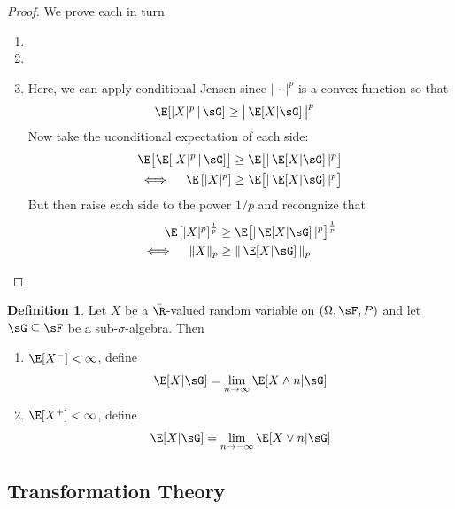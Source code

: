 \documentclass[12pt]{article}
\theoremstyle{plain}
\theoremstyle{definition}
\newtheorem{defn}[thm]{Definition}
\theoremstyle{remark}
\newcommand{\ra}{\rightarrow}
\newcommand{\limn}{\lim_{n\rightarrow\infty}}
\begin{document}
\begin{proof}
We prove each in turn
\begin{enumerate}[label=(\roman*)]
  \item
  \item
  \item Here, we can apply conditional Jensen since $|\,\cdot\,|^p$ is
    a convex function so that
    \begin{align*}
      \E[\lvert X\rvert^p\,|\,\sG]
      &\geq
      \big\lvert\,\E[X|\sG]\,\big\rvert^p
    \end{align*}
    Now take the uconditional expectation of each side:
    \begin{align*}
      \E\big[
      \E[\lvert X\rvert^p\,|\,\sG]
      \big]
      &\geq
      \E\big[
      \lvert\,\E[X|\sG]\,\rvert^p
      \big] \\
      \iff\quad
      \E\left[ \lvert X\rvert^p\right]
      &\geq
      \E\big[
      \lvert\,\E[X|\sG]\,\rvert^p
      \big]
    \end{align*}
    But then raise each side to the power $1/p$ and recongnize that
    \begin{align*}
      \E\left[ \lvert X\rvert^p\right]^{\frac{1}{p}}
      &\geq
      \E\big[
      \lvert\,\E[X|\sG]\,\rvert^p
      \big]^{\frac{1}{p}} \\
      \iff\quad
      \lVert X \rVert_p
      &\geq
      \lVert \, \E[X|\sG] \,\rVert_p
    \end{align*}
\end{enumerate}
\end{proof}

\begin{defn}
Let $X$ be a $\bar{\R}$-valued random variable on $(\Omega,\sF,P)$ and
let $\sG\subseteq \sF$ be a sub-$\sigma$-algebra. Then
\begin{enumerate}[label=(\roman*)]
  \item $\E[X^-]<\infty$, define
    \begin{align*}
      \E[X|\sG] = \limn \E[X\wedge n|\sG]
    \end{align*}
  \item $\E[X^+]<\infty$, define
    \begin{align*}
      \E[X|\sG] = \lim_{n\ra-\infty} \E[X\vee n|\sG]
    \end{align*}
\end{enumerate}
\end{defn}


\clearpage
\subsection{Transformation Theory}
\end{document}
